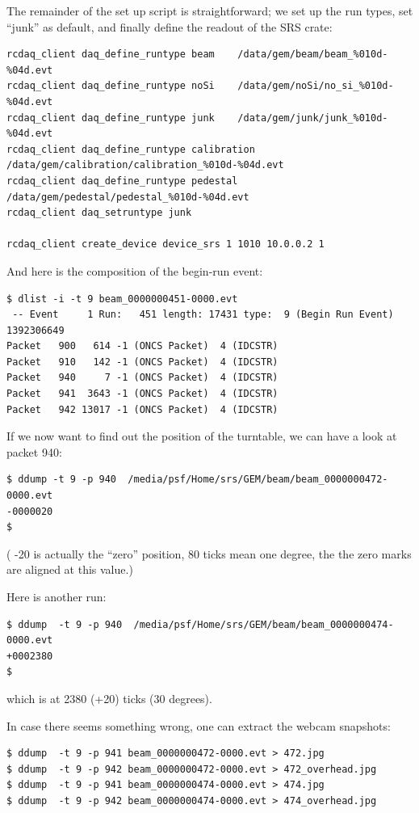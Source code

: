 \documentclass{article}[11pt]
\begin{document}
The remainder of the set up script is straightforward; we set up the run types, 
set ``junk'' as default, and finally define the readout of the SRS crate:

\begin{verbatim} 
rcdaq_client daq_define_runtype beam    /data/gem/beam/beam_%010d-%04d.evt
rcdaq_client daq_define_runtype noSi    /data/gem/noSi/no_si_%010d-%04d.evt
rcdaq_client daq_define_runtype junk    /data/gem/junk/junk_%010d-%04d.evt
rcdaq_client daq_define_runtype calibration /data/gem/calibration/calibration_%010d-%04d.evt
rcdaq_client daq_define_runtype pedestal /data/gem/pedestal/pedestal_%010d-%04d.evt
rcdaq_client daq_setruntype junk

rcdaq_client create_device device_srs 1 1010 10.0.0.2 1
\end{verbatim} 
 
And here is the composition of the begin-run event:

\begin{verbatim} 
$ dlist -i -t 9 beam_0000000451-0000.evt
 -- Event     1 Run:   451 length: 17431 type:  9 (Begin Run Event)  1392306649
Packet   900   614 -1 (ONCS Packet)  4 (IDCSTR)
Packet   910   142 -1 (ONCS Packet)  4 (IDCSTR)
Packet   940     7 -1 (ONCS Packet)  4 (IDCSTR)
Packet   941  3643 -1 (ONCS Packet)  4 (IDCSTR)
Packet   942 13017 -1 (ONCS Packet)  4 (IDCSTR)
\end{verbatim} 

If we now want to find out the position of the turntable, we can have  a
look at packet 940:

\begin{verbatim} 
$ ddump -t 9 -p 940  /media/psf/Home/srs/GEM/beam/beam_0000000472-0000.evt
-0000020
$
\end{verbatim} 

( -20 is actually the ``zero'' position, 80 ticks mean one degree, the the zero marks are aligned at this value.)

Here is another run:

\begin{verbatim} 
$ ddump  -t 9 -p 940  /media/psf/Home/srs/GEM/beam/beam_0000000474-0000.evt
+0002380
$ 
\end{verbatim} 

which is at 2380 (+20) ticks (30 degrees).

In case there seems something wrong, one can extract the webcam snapshots:

\begin{verbatim} 
$ ddump  -t 9 -p 941 beam_0000000472-0000.evt > 472.jpg
$ ddump  -t 9 -p 942 beam_0000000472-0000.evt > 472_overhead.jpg
$ ddump  -t 9 -p 941 beam_0000000474-0000.evt > 474.jpg
$ ddump  -t 9 -p 942 beam_0000000474-0000.evt > 474_overhead.jpg
\end{verbatim} 
\end{document}
